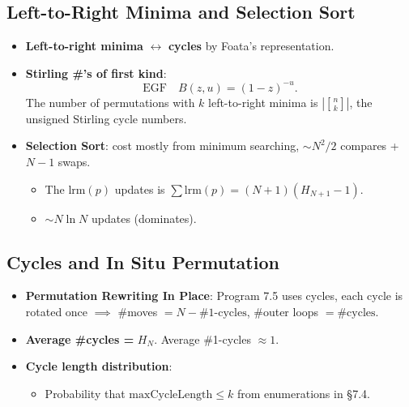 \documentclass[11pt,letterpaper]{article}
\begin{document}
\subsection{Left-to-Right Minima and Selection Sort}
\begin{itemize}
  \item \textbf{Left-to-right minima} $\leftrightarrow$ \textbf{cycles} by Foata's representation.
  \item \textbf{Stirling \#'s of first kind}: 
    \[
      \mathrm{EGF} \quad B(z,u)=(1-z)^{-u}.
    \]
    The number of permutations with $k$ left-to-right minima is $\left\lvert {n \brack k} \right\rvert$, the unsigned Stirling cycle numbers.
  \item \textbf{Selection Sort}: cost mostly from minimum searching, $\sim N^2/2$ compares + $N - 1$ swaps. 
    \begin{itemize}
      \item The $\mathrm{lrm}(p)$ updates is $\sum \mathrm{lrm}(p)= (N+1)(H_{N+1}-1)$.
      \item $\sim N \ln N$ updates (dominates).
    \end{itemize}
\end{itemize}

\subsection{Cycles and In Situ Permutation}
\begin{itemize}
  \item \textbf{Permutation Rewriting In Place}: Program 7.5 uses cycles, each cycle is rotated once $\implies$ \#moves $= N - \#1\text{-cycles}$, \#outer loops $= \#\text{cycles}$.
  \item \textbf{Average \#cycles = } $H_N$. \quad Average \#1-cycles $\approx 1$.
  \item \textbf{Cycle length distribution}:
    \begin{itemize}
      \item Probability that $\mathrm{maxCycleLength}\le k$ from enumerations in \S 7.4.
    \end{itemize}
\end{itemize}

\end{document}
